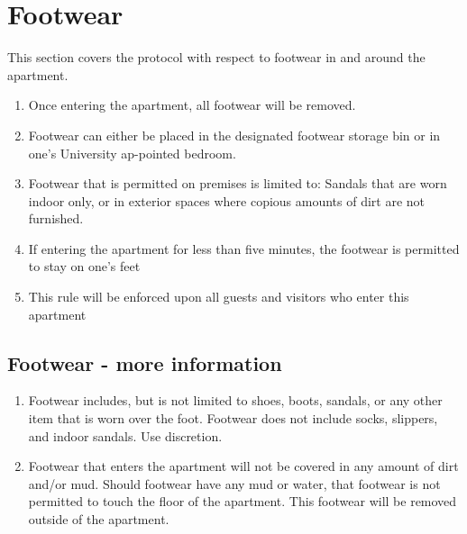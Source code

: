 \documentclass[10pt]{article}
\begin{document}
\section{Footwear}
This section covers the protocol with respect to footwear in and around the apartment.
\begin{enumerate}
	\item Once entering the apartment, all footwear will be removed.
	\item Footwear can either be placed in the designated footwear storage bin or in one’s University ap-pointed bedroom.
	\item Footwear that is permitted on premises is limited to: Sandals that are worn indoor only, or in exterior spaces where copious amounts of dirt are not furnished.
	\item If entering the apartment for less than five minutes, the footwear is permitted to stay on one’s feet
	\item This rule will be enforced upon all guests and visitors who enter this apartment

\end{enumerate}

\subsection{Footwear - more information}
\begin{enumerate}
	\item Footwear includes, but is not limited to shoes, boots, sandals, or any other item that is worn over the foot. Footwear does not include socks, slippers, and indoor sandals. Use discretion.
	\item Footwear that enters the apartment will not be covered in any amount of dirt and/or mud. Should footwear have any mud or water, that footwear is not permitted to touch the floor of the apartment. This footwear will be removed outside of the apartment.

\end{enumerate}
\end{document}
